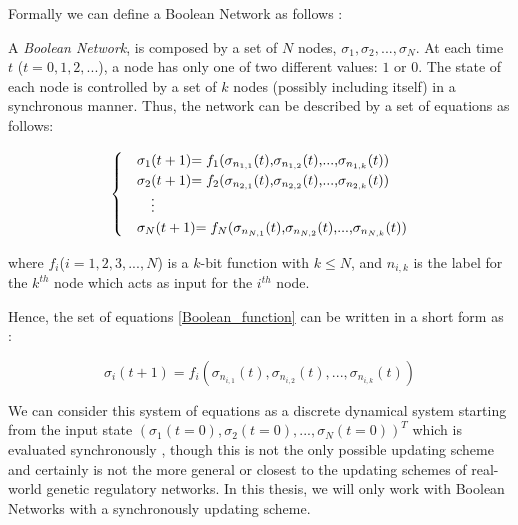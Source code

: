 Formally we can define a Boolean Network as follows \cite{coding_boolean}:
\begin{defn}
	A \textit{Boolean Network}, is composed by a set of $N$ nodes, $\sigma_{1}, \sigma_{2}, ..., \sigma_{N}$. At each time $t$ ($t=0,1,2,...$), a node has only one of two different values: $1$ or $0$. The state of each node is controlled by a set of $k$ nodes (possibly including itself) in a synchronous manner. Thus, the network can be described by a set of equations as follows:


\begin{equation}
\label{Boolean_function}
	\begin{cases}
	&\text{$\sigma_{1}$($t+1$)$=f_{1}$($\sigma_{n_{1,1}}$($t$),$\sigma_{n_{1,2}}$($t$),...,$\sigma_{n_{1,k}}$($t$))}\\
	&\text{$\sigma_{2}$($t+1$)$=f_{2}$($\sigma_{n_{2,1}}$($t$),$\sigma_{n_{2,2}}$($t$),...,$\sigma_{n_{2,k}}$($t$))}\\
	&\text{\quad \vdots}\\
	&\text{$\sigma_{N}$($t+1$)$=f_{N}$($\sigma_{n_{N,1}}$($t$),$\sigma_{n_{N,2}}$($t$),...,$\sigma_{n_{N,k}}$($t$))}\\
	\end{cases}	
\end{equation}

	where $f_{i}$($i=1,2,3,...,N$) is a $k$-bit function with $k \leq N$, and $n_{i,k}$ is the label for the $k^{th}$ node which acts as input for the $i^{th}$ node.
\end{defn}

Hence, the set of equations \ref{Boolean_function} can be written in a short form as \cite{bool_net}:

\begin{equation}
\label{Boolean_function2}
\sigma_{i}(t+1)=f_{i}(\sigma_{n_{i,1}}(t),\sigma_{n_{i,2}}(t),...,\sigma_{n_{i,k}}(t))
\end{equation}
 
We can consider this system of equations as a discrete dynamical system starting from the input state $(\sigma_{1}(t=0),\sigma_{2}(t=0),...,\sigma_{N}(t=0))^{T}$ which is evaluated synchronously \cite{coding_boolean}, though this is not the only possible updating scheme and certainly is not the more general or closest to the updating schemes of real-world genetic regulatory networks. In this thesis, we will only work with Boolean Networks with a synchronously updating scheme.



